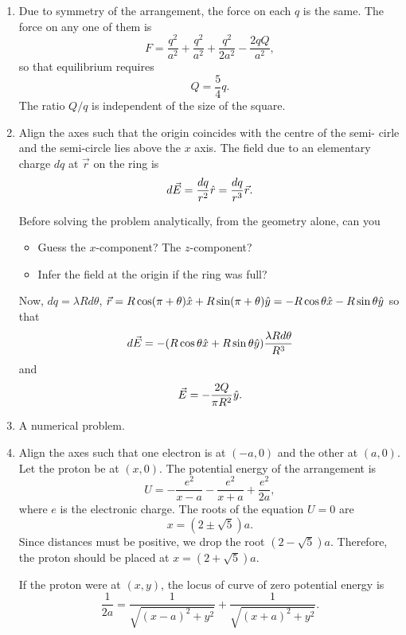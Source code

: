 \documentclass{article}
\begin{document}
\begin{enumerate}
\item Due to symmetry of the arrangement, the force on each $q$ is the same. The
force on any one of them is
\[
F = \frac{q^2}{a^2} + \frac{q^2}{a^2} + \frac{q^2}{2a^2} - \frac{2qQ}{a^2},
\]
so that equilibrium requires
\begin{equation}\label{e8}
Q = \frac{5}{4}q.
\end{equation}
The ratio $Q/q$ is independent of the size of the square.

\item Align the axes such that the origin coincides with the centre of the semi-
cirle and the semi-circle lies above the $x$ axis. The field due to an elementary
charge $dq$ at $\vec{r}$ on the ring is
\[
d\vec{E} = \frac{dq}{r^2}\hat{r} = \frac{dq}{r^3}\vec{r}.
\]

Before solving the problem analytically, from the geometry alone, can you
\begin{itemize}
\item Guess the $x$-component? The $z$-component?
\item Infer the field at the origin if the ring was full?
\end{itemize}
Now, $dq = \lambda Rd\theta$, $\vec{r} = R\cos(\pi + \theta)\hat{x} + R\sin(\pi + \theta)\hat{y}
= -R\cos\theta\hat{x} - R\sin\theta\hat{y}$ so
that
\[
d\vec{E} = -(R\cos\theta\hat{x} + R\sin\theta\hat{y})\frac{\lambda R d\theta}{R^3}
\]
and
\begin{equation}\label{e9}
\vec{E} = -\frac{2Q}{\pi R^2}\hat{y}.
\end{equation}

\item A numerical problem.

\item Align the axes such that one electron is at $(-a, 0)$ and the other at 
$(a, 0)$. Let the proton be at $(x, 0)$. The potential energy of the arrangement
is
\begin{equation}\label{e10}
U = -\frac{e^2}{x - a} - \frac{e^2}{x + a} + \frac{e^2}{2a},
\end{equation}
where $e$ is the electronic charge. The roots of the equation $U = 0$ are
\begin{equation}\label{e11}
x = (2 \pm \sqrt{5})a.
\end{equation}
Since distances must be positive, we drop the root $(2 - \sqrt{5})a$. Therefore,
the proton should be placed at $x = (2 + \sqrt{5})a$.

If the proton were at $(x, y)$, the locus of curve of zero potential energy is
\begin{equation}\label{e12}
\frac{1}{2a} = \frac{1}{\sqrt{(x - a)^2 + y^2}} + \frac{1}{\sqrt{(x + a)^2 + y^2}}.
\end{equation}


\end{enumerate}
\end{document}

